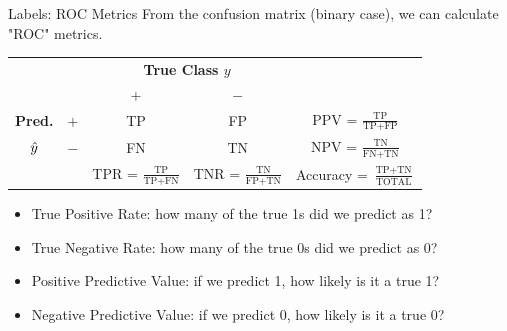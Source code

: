 \documentclass[11pt,compress,t,notes=noshow, xcolor=table]{beamer}
\begin{document}
\begin{vbframe}{Labels: ROC Metrics}
From the confusion matrix (binary case), we can calculate "ROC" metrics.



\begin{center}
\small
\renewcommand{\arraystretch}{1.5}
\begin{tabular}{cc||cc|c}
    & & \multicolumn{2}{c|}{\bfseries True Class $y$} & \\
    & & $+$ & $-$ & \\ 
    \hline \hline
    \bfseries Pred.     & $+$ & TP & FP & PPV = $\frac{\text{TP}}{\text{TP} + \text{FP}}$\\
              $\hat{y}$ & $-$ & FN & TN & NPV = $\frac{\text{TN}}{\text{FN} + \text{TN}}$\\
    \hline
    & & TPR = $\frac{\text{TP}}{\text{TP} + \text{FN}}$ & TNR = $\frac{\text{TN}}{\text{FP} + \text{TN}}$ & Accuracy = $\frac{\text{TP}+ \text{TN}}{\text{TOTAL}}$
\end{tabular}
\renewcommand{\arraystretch}{1}
\end{center}

\begin{itemize}
  \item True Positive Rate: how many of the true 1s did we predict as 1?
  \item True Negative Rate: how many of the true 0s did we predict as 0?
  \item Positive Predictive Value: if we predict 1, how likely is it a true 1?
  \item Negative Predictive Value: if we predict 0, how likely is it a true 0?
\end{itemize}
\end{vbframe}
\end{document}
